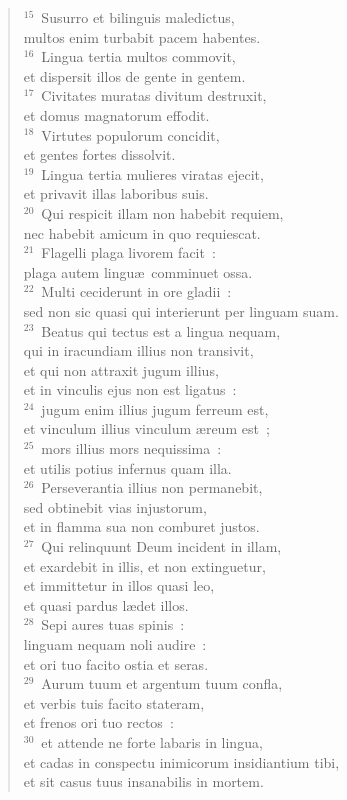 \begin{verse}${}^{15}$~Susurro et bilinguis maledictus,\\ multos enim turbabit pacem habentes.\\
${}^{16}$~Lingua tertia multos commovit,\\ et dispersit illos de gente in gentem.\\
${}^{17}$~Civitates muratas divitum destruxit,\\ et domus magnatorum effodit.\\
${}^{18}$~Virtutes populorum concidit,\\ et gentes fortes dissolvit.\\
${}^{19}$~Lingua tertia mulieres viratas ejecit,\\ et privavit illas laboribus suis.\\
${}^{20}$~Qui respicit illam non habebit requiem,\\ nec habebit amicum in quo requiescat.\\
${}^{21}$~Flagelli plaga livorem facit~:\\ plaga autem lingu\ae\ comminuet ossa.\\
${}^{22}$~Multi ceciderunt in ore gladii~:\\ sed non sic quasi qui interierunt per linguam suam.\\
${}^{23}$~Beatus qui tectus est a lingua nequam,\\ qui in iracundiam illius non transivit,\\ et qui non attraxit jugum illius,\\ et in vinculis ejus non est ligatus~:\\
${}^{24}$~jugum enim illius jugum ferreum est,\\ et vinculum illius vinculum \ae reum est~;\\
${}^{25}$~mors illius mors nequissima~:\\ et utilis potius infernus quam illa.\\
${}^{26}$~Perseverantia illius non permanebit,\\ sed obtinebit vias injustorum,\\ et in flamma sua non comburet justos.\\
${}^{27}$~Qui relinquunt Deum incident in illam,\\ et exardebit in illis, et non extinguetur,\\ et immittetur in illos quasi leo,\\ et quasi pardus l\ae det illos.\\
${}^{28}$~Sepi aures tuas spinis~:\\ linguam nequam noli audire~:\\ et ori tuo facito ostia et seras.\\
${}^{29}$~Aurum tuum et argentum tuum confla,\\ et verbis tuis facito stateram,\\ et frenos ori tuo rectos~:\\
${}^{30}$~et attende ne forte labaris in lingua,\\ et cadas in conspectu inimicorum insidiantium tibi,\\ et sit casus tuus insanabilis in mortem.\end{verse}



